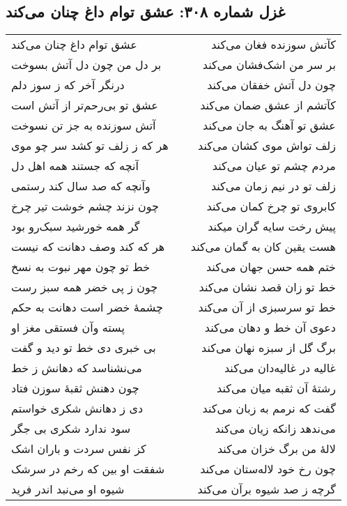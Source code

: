 \begin{center}
\section*{غزل شماره ۳۰۸: عشق توام داغ چنان می‌کند}
\label{sec:308}
\begin{longtable}{l p{0.5cm} r}
عشق توام داغ چنان می‌کند
&&
کآتش سوزنده فغان می‌کند
\\
بر دل من چون دل آتش بسوخت
&&
بر سر من اشک‌فشان می‌کند
\\
درنگر آخر که ز سوز دلم
&&
چون دل آتش خفقان می‌کند
\\
عشق تو بی‌رحم‌تر از آتش است
&&
کآتشم از عشق ضمان می‌کند
\\
آتش سوزنده به جز تن نسوخت
&&
عشق تو آهنگ به جان می‌کند
\\
هر که ز زلف تو کشد سر چو موی
&&
زلف تواش موی کشان می‌کند
\\
آنچه که جستند همه اهل دل
&&
مردم چشم تو عیان می‌کند
\\
وآنچه که صد سال کند رستمی
&&
زلف تو در نیم زمان می‌کند
\\
چون نزند چشم خوشت تیر چرخ
&&
کابروی تو چرخ کمان می‌کند
\\
گر همه خورشید سبک‌رو بود
&&
پیش رخت سایه گران میکند
\\
هر که کند وصف دهانت که نیست
&&
هست یقین کان به گمان می‌کند
\\
خط تو چون مهر نبوت به نسخ
&&
ختم همه حسن جهان می‌کند
\\
چون ز پی خضر همه سبز رست
&&
خط تو زان قصد نشان می‌کند
\\
چشمهٔ خضر است دهانت به حکم
&&
خط تو سرسبزی از آن می‌کند
\\
پسته وآن فستقی مغز او
&&
دعوی آن خط و دهان می‌کند
\\
بی خبری دی خط تو دید و گفت
&&
برگ گل از سبزه نهان می‌کند
\\
می‌نشناسد که دهانش ز خط
&&
غالیه در غالیه‌دان می‌کند
\\
چون دهنش ثقبهٔ سوزن فتاد
&&
رشتهٔ آن ثقبه میان می‌کند
\\
دی ز دهانش شکری خواستم
&&
گفت که نرمم به زبان می‌کند
\\
سود ندارد شکری بی جگر
&&
می‌ندهد زانکه زیان می‌کند
\\
کز نفس سردت و باران اشک
&&
لالهٔ من برگ خزان می‌کند
\\
شفقت او بین که رخم در سرشک
&&
چون رخ خود لاله‌ستان می‌کند
\\
شیوه او می‌نبد اندر فرید
&&
گرچه ز صد شیوه برآن می‌کند
\\
\end{longtable}
\end{center}
